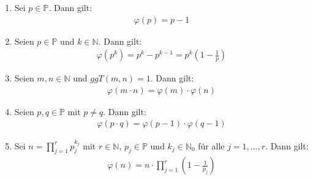 \begin{enumerate}
    \item Sei $p\in \mathbb{P}$.
    Dann gilt:
    \begin{align*}
        \varphi(p)=p-1
    \end{align*}
    \item Seien $p\in \mathbb{P}$ und $k \in \mathbb{N}$.
    Dann gilt:
    \begin{align*}
        \varphi(p^k)=p^k-p^{k-1}=p^k(1-\frac{1}{p})
    \end{align*}
    \item Seien $m,n\in \mathbb{N}$ und $ggT(m,n)=1$.
    Dann gilt:
    \begin{align*}
        \varphi(m\cdot n)=\varphi(m)\cdot \varphi(n)
    \end{align*}
    \item Seien $p,q\in \mathbb{P}$ mit $p\neq q$.
    Dann gilt:
    \begin{align*}
        \varphi(p\cdot q)=\varphi(p-1)\cdot \varphi(q-1)
    \end{align*}
    \item Sei $n=\prod_{j=1}^{r}p_j^{k_{j}}$ mit $r\in \mathbb{N}$, $p_j\in\mathbb{P}$ und $k_j\in \mathbb{N}_0$ für alle $j=1,\dots,r$.
    Dann gilt:
    \begin{align*}
        \varphi(n)=n\cdot \prod_{j=1}^{r}(1-\frac{1}{p_j})
    \end{align*}
\end{enumerate}
